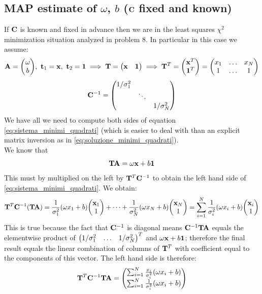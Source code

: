 \documentclass[a4paper]{article}
\newcommand{\mat}[1]{\vb{#1}}
\begin{document}
\subsection{MAP estimate of $\omega$, $b$ ($\mat{C}$ fixed and known)}
If $\mat{C}$ is known and fixed in advance then we are in the least squares $\chi^2$ minimization situation analyzed in problem 8. In particular in this case we assume:
\begin{equation*}
    \vb{A} = \mqty(\omega \\ b), \ \vb{t}_1 = \vb{x}, \ \vb{t}_2 = \vb{1} \implies \mat{T} = \mqty(\vb{x} & \vb{1}) \implies \mat{T}^T = \mqty(\vb{x}^T \\ \vb{1}^T) = \mqty(x_1 & \dots & x_N \\ 1 & \dots & 1)
\end{equation*}
\begin{equation*}
    \mat{C}^{-1} = \mqty(\dmat{1/\sigma_1^2, \ddots, 1/\sigma_N^2})
\end{equation*}
We have all we need to compute both sides of equation \eqref{eq:sistema_minimi_quadrati} (which is easier to deal with than an explicit matrix inversion as in \eqref{eq:soluzione_minimi_quadrati}).\\
We know that
\begin{equation*}
    \mat{T}\vb{A} = \omega \vb{x}+b\vb{1}
\end{equation*}
This must by multiplied on the left by $\mat{T}^T\mat{C}^{-1}$ to obtain the left hand side of \eqref{eq:sistema_minimi_quadrati}. We obtain:
\begin{equation*}
    \mat{T}^T\mat{C}^{-1}(\mat{T}\vb{A}) = \frac{1}{\sigma_1^2} (\omega x_1+b)\mqty(\vb{x}_1 \\ 1) + \dots + \frac{1}{\sigma_N^2} (\omega x_N+b)\mqty(\vb{x}_N \\ 1) = \sum_{i=1}^N \frac{1}{\sigma_i^2} (\omega x_i+b)\mqty(\vb{x}_i \\ 1)
\end{equation*}
This is true because the fact that $\mat{C}^{-1}$ is diagonal means $\mat{C}^{-1}\mat{T}\vb{A}$ equals the elementwise product of $\mqty(1/\sigma_1^2 & \dots & 1/\sigma_N^2)^T$ and $\omega\vb{x}+b\vb{1}$; therefore the final result equals the linear combination of columns of $\mat{T}^T$ with coefficient equal to the components of this vector. The left hand side is therefore:
\begin{equation*}
    \mat{T}^T\mat{C}^{-1}\mat{T}\vb{A} = \mqty(\sum_{i=1}^N \frac{x_i}{\sigma_i^2}(\omega x_i+b) \\ \sum_{i=1}^N \frac{1}{\sigma_i^2}(\omega x_i+b))
\end{equation*}
\end{document}
